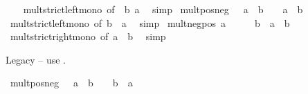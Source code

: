 \begin{isabellebody}
%
\isadelimproof
\ \ %
\endisadelimproof
%
\isatagproof
{}\isamarkupfalse%
\ mult{\isacharunderscore}{\kern0pt}strict{\isacharunderscore}{\kern0pt}left{\isacharunderscore}{\kern0pt}mono\ {\isacharbrackleft}{\kern0pt}of\ {}\ b\ a{\isacharbrackright}{\kern0pt}\ \isamarkupfalse%
\ simp%
\endisatagproof
{\isafoldproof}%
%
\isadelimproof
\isanewline
%
\endisadelimproof
\isanewline
{}\isamarkupfalse%
\ mult{\isacharunderscore}{\kern0pt}pos{\isacharunderscore}{\kern0pt}neg{\isacharcolon}{\kern0pt}\ {\isachardoublequoteopen}{}\ {\isacharless}{\kern0pt}\ a\ {\isasymLongrightarrow}\ b\ {\isacharless}{\kern0pt}\ {}\ {\isasymLongrightarrow}\ a\ {\isacharasterisk}{\kern0pt}\ b\ {\isacharless}{\kern0pt}\ {}{\isachardoublequoteclose}\isanewline
%
\isadelimproof
\ \ %
\endisadelimproof
%
\isatagproof
{}\isamarkupfalse%
\ mult{\isacharunderscore}{\kern0pt}strict{\isacharunderscore}{\kern0pt}left{\isacharunderscore}{\kern0pt}mono\ {\isacharbrackleft}{\kern0pt}of\ b\ {}\ a{\isacharbrackright}{\kern0pt}\ \isamarkupfalse%
\ simp%
\endisatagproof
{\isafoldproof}%
%
\isadelimproof
\isanewline
%
\endisadelimproof
\isanewline
{}\isamarkupfalse%
\ mult{\isacharunderscore}{\kern0pt}neg{\isacharunderscore}{\kern0pt}pos{\isacharcolon}{\kern0pt}\ {\isachardoublequoteopen}a\ {\isacharless}{\kern0pt}\ {}\ {\isasymLongrightarrow}\ {}\ {\isacharless}{\kern0pt}\ b\ {\isasymLongrightarrow}\ a\ {\isacharasterisk}{\kern0pt}\ b\ {\isacharless}{\kern0pt}\ {}{\isachardoublequoteclose}\isanewline
%
\isadelimproof
\ \ %
\endisadelimproof
%
\isatagproof
{}\isamarkupfalse%
\ mult{\isacharunderscore}{\kern0pt}strict{\isacharunderscore}{\kern0pt}right{\isacharunderscore}{\kern0pt}mono\ {\isacharbrackleft}{\kern0pt}of\ a\ {}\ b{\isacharbrackright}{\kern0pt}\ \isamarkupfalse%
\ simp%
\endisatagproof
{\isafoldproof}%
%
\isadelimproof
%
\endisadelimproof
%
\begin{isamarkuptext}%
Legacy -- use .%
\end{isamarkuptext}\isamarkuptrue%
\isamarkupfalse%
\ mult{\isacharunderscore}{\kern0pt}pos{\isacharunderscore}{\kern0pt}neg{}{\isacharcolon}{\kern0pt}\ {\isachardoublequoteopen}{}\ {\isacharless}{\kern0pt}\ a\ {\isasymLongrightarrow}\ b\ {\isacharless}{\kern0pt}\ {}\ {\isasymLongrightarrow}\ b\ {\isacharasterisk}{\kern0pt}\ a\ {\isacharless}{\kern0pt}\ {}{\isachardoublequoteclose}\isanewline

\end{isabellebody}
